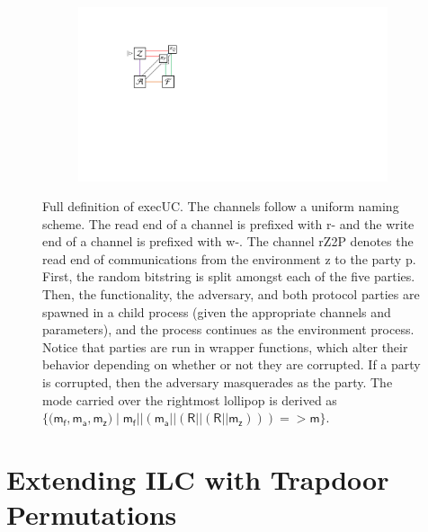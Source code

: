 \begin{figure}[h]
\begin{subfigure}{.75\textwidth}

\end{subfigure}
\begin{subfigure}{0.24\textwidth}
\includegraphics[width=\linewidth]{graphics/execUC-colored}
\end{subfigure}
\caption{Full definition of \textsf{execUC}. The channels follow a uniform
naming scheme. The read end of a channel is prefixed with \textsf{r-} and the
write end of a channel is prefixed with \textsf{w-}. The channel \textsf{rZ2P}
denotes the read end of communications from the environment \textsf{z} to the
party \textsf{p}. First, the random bitstring is split amongst each of the five
parties. Then, the functionality, the adversary, and both protocol parties are
spawned in a child process (given the appropriate channels and parameters), and
the process continues as the environment process. Notice that parties are run in
wrapper functions, which alter their behavior depending on whether or not they
are corrupted. If a party is corrupted, then the adversary masquerades as the
party. The mode carried over the rightmost lollipop is derived as $\{(\mathsf{m}_{\mathsf{f}},\mathsf{m}_{\mathsf{a}},\mathsf{m_{\mathsf{z}}) \mid \mathsf{m}_{\mathsf{f}}
|| (\mathsf{m}_{\mathsf{a}} || (\mathsf{R} || (\mathsf{R}
|| \mathsf{m}_{\mathsf{z}}))) => \mathsf{m}}\}$.}
\label{fig:execUC}
\end{figure}
\newpage
\twocolumn

\section{Extending ILC with Trapdoor Permutations}


